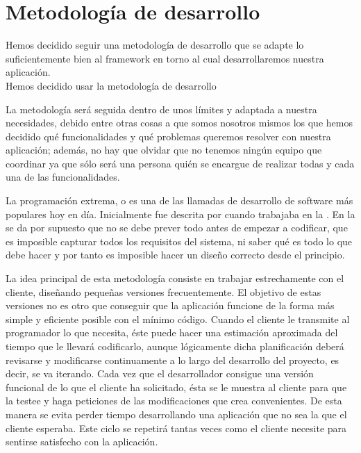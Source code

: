 \section{Metodología de desarrollo}
Hemos decidido seguir una metodología de desarrollo que se adapte lo
suficientemente bien al framework en torno al cual desarrollaremos
nuestra aplicación.\\

Hemos decidido usar la metodología de desarrollo 

La metodología será seguida dentro de unos límites y adaptada a
nuestra necesidades, debido entre otras cosas a que somos nosotros
mismos los que hemos decidido qué funcionalidades y qué problemas
queremos resolver con nuestra aplicación; además, no hay que olvidar
que no tenemos ningún equipo que coordinar ya que sólo será una
persona quién se encargue de realizar todas y cada una de las
funcionalidades.

La programación extrema, o  es una de las
llamadas  de desarrollo de software más
populares hoy en día. Inicialmente fue descrita por  cuando trabajaba en la . En la
 se da por supuesto que no se debe prever todo antes de
empezar a codificar, que es imposible capturar todos los requisitos
del sistema, ni saber qué es todo lo que debe hacer y por tanto es
imposible hacer un diseño correcto desde el principio.

La idea principal de esta metodología consiste en trabajar
estrechamente con el cliente, diseñando pequeñas versiones
frecuentemente. El objetivo de estas versiones no es otro que
conseguir que la aplicación funcione de la forma más simple y
eficiente posible con el mínimo código. Cuando el cliente le transmite
al programador lo que necesita, éste puede hacer una estimación
aproximada del tiempo que le llevará codificarlo, aunque lógicamente
dicha planificación deberá revisarse y modificarse continuamente a lo
largo del desarrollo del proyecto, es decir, se va iterando. Cada vez
que el desarrollador consigue una versión funcional de lo que el
cliente ha solicitado, ésta se le muestra al cliente para que la
testee y haga peticiones de las modificaciones que crea
convenientes. De esta manera se evita perder tiempo desarrollando una
aplicación que no sea la que el cliente esperaba. Este ciclo se
repetirá tantas veces como el cliente necesite para sentirse
satisfecho con la aplicación.

